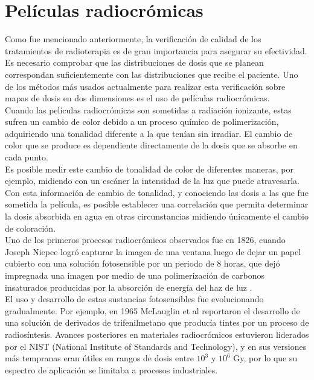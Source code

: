  
\section{Películas radiocrómicas}
Como fue mencionado anteriormente, la verificación de calidad de los tratamientos de radioterapia es de gran importancia para asegurar su efectividad. Es necesario comprobar que las distribuciones de dosis que se planean correspondan suficientemente con las distribuciones que recibe el paciente. Uno de los métodos más usados actualmente para realizar esta verificación sobre mapas de dosis en dos dimensiones es el uso de películas radiocrómicas.\\

Cuando las películas radiocrómicas son sometidas a radiación ionizante, estas sufren un cambio de color debido a un proceso químico de polimerización, adquiriendo una tonalidad diferente a la que tenían sin irradiar. El cambio de color que se produce es dependiente directamente de la dosis que se absorbe en cada punto. \\

Es posible medir este cambio de tonalidad de color de diferentes maneras, por ejemplo, midiendo con un escáner la intensidad de la luz que puede atravesarla. Con esta información de cambio de tonalidad, y conociendo las dosis a las que fue sometida la película, es posible establecer una correlación que permita determinar la dosis absorbida en agua en otras circunstancias midiendo únicamente el cambio de coloración. \\

Uno de los primeros procesos radiocrómicos observados fue en 1826, cuando Joseph Niepce logró capturar la imagen de una ventana luego de dejar un papel cubierto con una solución fotosensible por un periodo de 8 horas, que dejó impregnada una imagen por medio de una polimerización de carbonos insaturados producidas por la absorción de energía del haz de luz \cite{Williams2011}.\\

El uso y desarrollo de estas sustancias fotosensibles fue evolucionando gradualmente. Por ejemplo, en 1965 McLauglin et al \cite{McLaughlin1965} reportaron el desarrollo de una solución de derivados de trifenilmetano que producía tintes por un proceso de radiosíntesis. Avances posteriores en materiales radiocrómicos estuvieron liderados por el NIST (National Institute of Standards and Technology), y en sus versiones más tempranas eran útiles en rangos de dosis entre $10^3$ y $10^6$ Gy, por lo que su espectro de aplicación se limitaba a procesos industriales\cite{Williams2011}.\\

